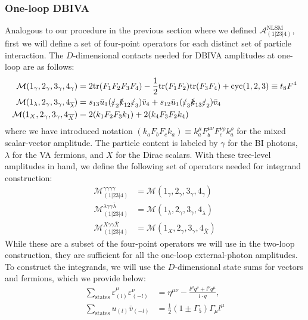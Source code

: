 \documentclass[11pt,letter]{article}
\begin{document}
\subsubsection{One-loop DBIVA}\label{sec:1loopDBIU}
Analogous to our procedure in the previous section where we defined $\mathcal{A}^{\text{NLSM}}_{(1|23|4)}$, first we will define a set of four-point operators for each distinct set of particle interaction. The $D$-dimensional contacts needed for DBIVA amplitudes at one-loop are as follows:
\begin{align}
\mathcal{M}(1_\gamma,2_\gamma,3_\gamma,4_\gamma) &= 2\text{tr}(F_1F_2F_3F_4) - \frac{1}{2}\text{tr}(F_1F_2)\text{tr}(F_3F_4)+\text{cyc}(1,2,3) \equiv t_8 F^4
\\
\mathcal{M}(1_\lambda,2_\gamma,3_\gamma,4_{\overline{\lambda}}) &= s_{13}\bar{u}_1(\slashed{\varepsilon}_2\slashed{k}_{12}\slashed{\varepsilon}_3) \bar{v}_4 + s_{12}\bar{u}_1(\slashed{\varepsilon}_3\slashed{k}_{13}\slashed{\varepsilon}_2) \bar{v}_4
\\
\mathcal{M}(1_X,2_\gamma,3_\gamma,4_{\overline{X}}) &= 2 (k_1 F_2 F_3 k_1) +2 (k_4 F_3 F_2 k_4)
\end{align}
where we have introduced notation $(k_a F_b F_c k_a) \equiv k_a^\mu F^{\mu\nu}_bF^{\nu\rho}_c k_a^\rho$ for the mixed scalar-vector amplitude. The particle content is labeled by $\gamma$ for the BI photons, $\lambda$ for the VA fermions, and $X$ for the Dirac scalars. With these tree-level amplitudes in hand, we define the following set of operators needed for integrand construction:
\begin{align}
\mathcal{M}^{\gamma \gamma \gamma \gamma }_{(1|23|4)} &= \mathcal{M}(1_\gamma,2_\gamma,3_\gamma,4_\gamma)   
\\
\mathcal{M}^{\lambda \gamma \gamma \bar{\lambda} }_{(1|23|4)} &= \mathcal{M}(1_\lambda,2_\gamma,3_\gamma,4_{\overline{\lambda}})
\\
\mathcal{M}^{X \gamma \gamma \bar{X} }_{(1|23|4)} &= \mathcal{M}(1_X,2_\gamma,3_\gamma,4_{\overline{X}}) 
\end{align}
While these are a subset of the four-point operators we will use in the two-loop construction, they are sufficient for all the one-loop external-photon amplitudes. To construct the integrands, we will use the $D$-dimensional state sums for vectors and fermions, which we provide below:
\begin{align}
\sum_{\text{states}}\varepsilon^\mu_{(l)}\varepsilon^\nu_{(-l)} &= \eta^{\mu\nu} - \frac{l^\mu q^\nu+l^\nu q^\mu}{l\cdot q},
\\
\sum_{\text{states}}u_{(l)}\bar{v}_{(-l)} &= \frac{1}{2}(1\pm \Gamma_5)\Gamma_\mu l^\mu 
\end{align}
\end{document}
